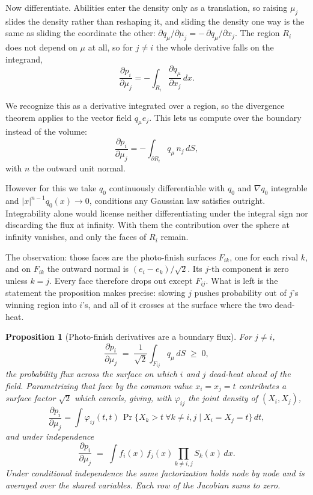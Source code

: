 \documentclass[11pt]{article}
\newtheorem{proposition}{Proposition}
\begin{document}
Now differentiate. Abilities enter the density only as a translation, so
raising $\mu_j$ slides the density rather than reshaping it, and sliding
the density one way is the same as sliding the coordinate the other:
$\partial q_\mu/\partial\mu_j=-\,\partial q_\mu/\partial x_j$. The region
$R_i$ does not depend on $\mu$ at all, so for $j\ne i$ the whole
derivative falls on the integrand,
\[
  \frac{\partial p_i}{\partial\mu_j}
   =-\int_{R_i}\frac{\partial q_\mu}{\partial x_j}\,dx .
\]

We recognize this as a derivative integrated over a region, so the
divergence theorem applies to the vector field $q_\mu e_j$. This lets us
compute over the boundary instead of the volume:
\[
  \frac{\partial p_i}{\partial\mu_j}
   =-\int_{\partial R_i}q_\mu\,n_j\,dS ,
\]
with $n$ the outward unit normal.

However for this we take $q_0$ continuously differentiable with $q_0$ and
$\nabla q_0$ integrable and $|x|^{n-1}q_0(x)\to0$, conditions any
Gaussian law satisfies outright. Integrability alone would
license neither differentiating under the integral sign nor discarding
the flux at infinity. With them the contribution over the sphere at
infinity vanishes, and only the faces of $R_i$ remain.

The observation: those faces are the photo-finish surfaces $F_{ik}$, one
for each rival $k$, and on $F_{ik}$ the outward normal is
$(e_i-e_k)/\sqrt2$. Its $j$-th component is zero unless $k=j$. Every face
therefore drops out except $F_{ij}$. What is left is the statement the
proposition makes precise: slowing $j$ pushes probability out of $j$'s
winning region into $i$'s, and all of it crosses at the surface where the
two dead-heat.

\begin{proposition}[Photo-finish derivatives are a boundary flux]
\label{prop:tie}
For $j\ne i$,
\begin{equation}\label{eq:flux}
\frac{\partial p_i}{\partial\mu_j}
 \;=\;\frac{1}{\sqrt2}\int_{F_{ij}}q_\mu\,dS\;\ge\;0 ,
\end{equation}
the probability flux across the surface on which $i$ and $j$ dead-heat
ahead of the field. Parametrizing that face by the common value
$x_i=x_j=t$ contributes a surface factor $\sqrt2$ which cancels, giving,
with $\varphi_{ij}$ the joint density of $(X_i,X_j)$,
\begin{equation}\label{eq:tiecorr}
\frac{\partial p_i}{\partial\mu_j}
 =\int \varphi_{ij}(t,t)\,
   \Pr\{X_k>t\ \forall k\ne i,j \mid X_i=X_j=t\}\,dt ,
\end{equation}
and under independence
\begin{equation}\label{eq:tie}
\frac{\partial p_i}{\partial \mu_j}
  \;=\; \int f_i(x)\,f_j(x)\prod_{k\ne i,j}S_k(x)\,dx .
\end{equation}
Under conditional independence the same factorization holds node by node
and is averaged over the shared variables. Each row of the Jacobian sums
to zero.
\end{proposition}
\end{document}
